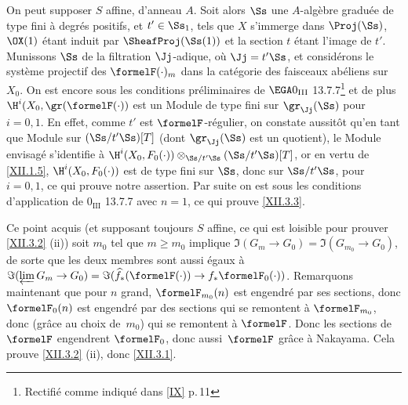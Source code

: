 On peut supposer $S$ affine, d'anneau $A$. Soit alors $\Ss$ une $A$-alg\`ebre gradu\'ee de type fini \`a degr\'es positifs, et $t'\in\Ss_1$, tels que $X$ s'immerge dans $\Proj(\Ss)$, $\OX(1)$ \'etant induit par $\SheafProj(\Ss(1))$ et la section $t$ \'etant l'image de $t'$. Munissons $\Ss$ de la filtration $\Jj$-adique, o\`u $\Jj=t'\Ss$, et consid\'erons le syst\`eme projectif des $\formelF(\cdot)_m$ dans la cat\'egorie des faisceaux ab\'eliens sur $X_0$. On est encore sous les conditions pr\'eliminaires de $\EGA 0_{\textup{III}}$ 13.7.7\footnote{Rectifi\'e comme indiqu\'e dans \ref{IX} p.\,11} et de plus $\H^i(X_0, \gr(\formelF(\cdot))$ est un Module de type fini sur $\gr_\Jj(\Ss)$ pour $i=0, 1$. En effet, comme $t'$ est $\formelF$-r\'egulier, on constate aussit\^{o}t qu'en tant que Module sur $(\Ss /t'\Ss)[T]$ (dont $\gr_\Jj(\Ss)$ est un quotient), le Module envisag\'e s'identifie \`a $\H^i(X_0, F_0(\cdot))\otimes_{\Ss /t'\Ss}(\Ss /t'\Ss)[T]$, or en vertu de \ref{XII.1.5}, $\H^i(X_0, F_0(\cdot))$ est de type fini sur $\Ss$, donc sur $\Ss /t'\Ss$, pour $i=0, 1$, ce qui prouve notre assertion. Par suite on est sous les conditions d'application de $0_{\text{III}}$ 13.7.7 avec $n=1$, ce qui prouve \ref{XII.3.3}.

Ce point acquis (et supposant toujours $S$ affine, ce qui est loisible pour prouver \ref{XII.3.2} (ii)) soit $m_0$ tel que $m\geq m_0$ implique $\Im(G_m\to G_0)= \Im(G_{m_0}\to G_0)$, de sorte que les deux membres sont aussi \'egaux \`a $\Im(\varprojlim G_m\to G_0) = \Im(\widehat{f}_\ast(\formelF(\cdot))\to f_\ast\formelF_0(\cdot))$. Remarquons maintenant que pour $n$ grand, $\formelF_{m_0}(n)$ est engendr\'e par ses sections, donc $\formelF_0(n)$ est engendr\'e par des sections qui se remontent \`a $\formelF_{m_0}$, donc (gr\^ace au choix de~$m_0$) qui se remontent \`a $\formelF$. Donc les sections de $\formelF$ engendrent $\formelF_0$, donc aussi~$\formelF$ gr\^ace \`a Nakayama. Cela prouve \ref{XII.3.2} (ii), donc \ref{XII.3.1}.

